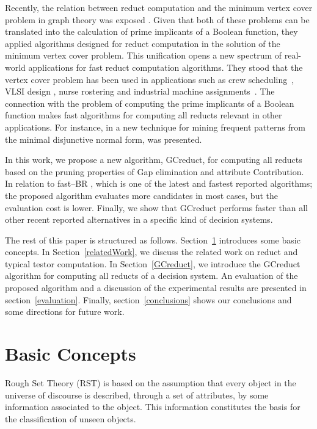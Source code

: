 \documentclass[number,preprint,review,12pt]{elsarticle}
\begin{document}
  Recently, the relation between reduct computation and the minimum vertex cover problem in graph theory was exposed \cite{chen2015}. Given that both of these problems can be translated into the calculation of prime implicants of a Boolean function, they applied algorithms designed for reduct computation in the solution of the minimum vertex cover problem. This unification opens a new spectrum of real-world applications for fast reduct computation algorithms. They stood that the vertex cover problem has been used in applications such as crew scheduling~\citep{Sherali1984}, VLSI design \citep{Bhattacharyya2000}, nurse rostering \citep{Caprara1998} and industrial machine assignments~\citep{Woodyatt1993}. The connection with the problem of computing the prime implicants of a Boolean function makes fast algorithms for computing all reducts relevant in other applications. For instance, in \cite{Li2015} a new technique for mining frequent patterns from the minimal disjunctive normal form, was presented.

  In this work, we propose a new algorithm, GCreduct, for computing all reducts based on the pruning properties of Gap elimination and attribute Contribution. In relation to fast--BR \citep{Lias13}, which is one of the latest and fastest reported algorithms; the proposed algorithm evaluates more candidates in most cases, but the evaluation cost is lower. Finally, we show that GCreduct performs faster than all other recent reported alternatives in a specific kind of decision systems. 
  
  The rest of this paper is structured as follows. Section~\ref{basicConcepts}  introduces some basic concepts. In Section~\ref{relatedWork}, we discuss the related work on reduct and typical testor computation.  In Section~\ref{GCreduct}, we introduce the GCreduct algorithm for computing all reducts of a decision system. An evaluation of the proposed algorithm and a discussion of the experimental results are presented in section~\ref{evaluation}. Finally, section~\ref{conclusions} shows our conclusions and some directions for future work.
   
\section{Basic Concepts}\label{basicConcepts}
  Rough Set Theory (RST) is based on the assumption that every object in the universe of discourse is described, through a set of attributes, by some information associated to the object. This information constitutes the basis for the classification of unseen objects. 
  	
\end{document}

